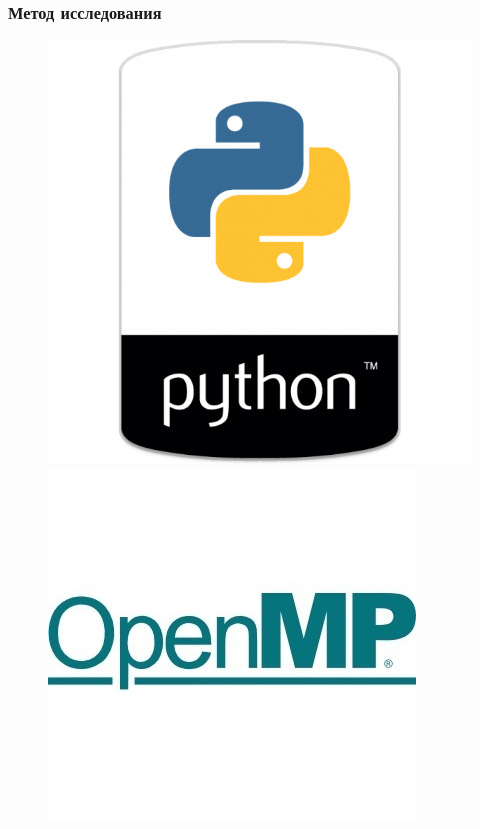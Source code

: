 \documentclass[fullscreen=true, unicode, bookmarks=false]{beamer}
\begin{document}
\begin{frame}
\frametitle{ Метод исследования } 

\begin{figure} 
\includegraphics[scale=0.25]{python.png}  
\hfill
\includegraphics[scale=0.6]{openmp.jpg} 
\end{figure}

\end{frame}
\end{document}
